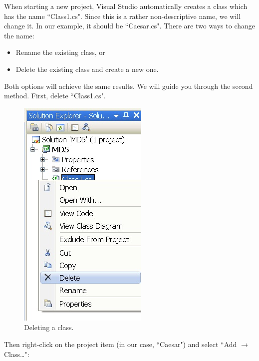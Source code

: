 When starting a new project, Visual Studio automatically creates a class which has the name ``Class1.cs".  Since this is a rather non-descriptive name, we will change it. In our example, it should be ``Caesar.cs". There are two ways to change the name:

\begin{itemize}
	\item Rename the existing class, or
	\item Delete the existing class and create a new one.
\end{itemize}

\noindent Both options will achieve the same results. We will guide you through the second method. First, delete ``Class1.cs".

\begin{figure}[h!]
	\centering
		\includegraphics{figures/new_class.jpg}
	\caption{Deleting a class.}
	\label{fig:new_class}
\end{figure}
\clearpage

\noindent Then right-click on the project item (in our case, ``Caesar") and select ``Add $\rightarrow$ Class\ldots ":

